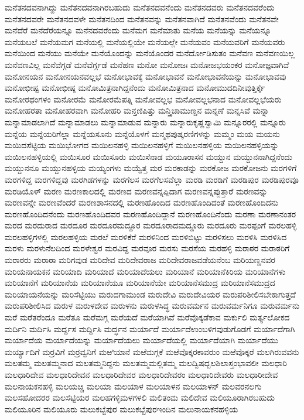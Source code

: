 {ಮನೆತನದವನಾಗಿದ್ದು
ಮನೆತನದವನಾಗಿರಬಹುದು
ಮನೆತನದವನೆಂದು
ಮನೆತನದವರು
ಮನೆತನದವರೆಂದು
ಮನೆತನದವರೇ
ಮನೆತನದವಳೇ
ಮನೆತನದಿಂದ
ಮನೆತನವನ್ನು
ಮನೆತನವಾಗಿದೆ
ಮನೆತನವೆಂದು
ಮನೆತನವೇ
ಮನೆದೆರೆ
ಮನೆದೆರೆಯನ್ನೂ
ಮನೆನದವರೆಂದು
ಮನೆಮಗ
ಮನೆಮಾತು
ಮನೆಯ
ಮನೆಯನ್ನು
ಮನೆಯನ್ನೂ
ಮನೆಯಬಲೆ
ಮನೆಯಮಗ
ಮನೆಯಲ್ಲಿ
ಮನೆಯಲ್ಲಿಯೇ
ಮನೆಯಲ್ಲೇ
ಮನೆಯವಂ
ಮನೆಯವರಿಗೆ
ಮನೆಯವರು
ಮನೆಯಿಂದ
ಮನೆಯು
ಮನೆಯೇ
ಮನೆಯೊಂದನ್ನು
ಮನೆಯೊಂದರ
ಮನೆರ್ದೋಡಿಸುತಂ
ಮನೆವಣ
ಮನೆವಣಯಿಲ್ಲ
ಮನೆವಣವಿಲ್ಲ
ಮನೆವೆಗ್ಗಡೆ
ಮನೆವೆರ್ಗ್ಗಡೆ
ಮನೆಹಣ
ಮನೋ
ಮನೋಜಃ
ಮನೋಜಭಯಂಕರ
ಮನೋಜ್ಞವಾಗಿವೆ
ಮನೋನಯನ
ಮನೋನಯನವಲ್ಲಭೆ
ಮನೋಭಾವಕ್ಕೆ
ಮನೋಭಾವನೆ
ಮನೋಭಾವನೆಯನ್ನು
ಮನೋಭಾವವು
ಮನೋಭೀಷ್ಟ
ಮನೋಭೀಷ್ಠ
ಮನೋಮಿತ್ರನಾಗಿದ್ದನೆಂದು
ಮನೋಮಿತ್ರನಾದ
ಮನೋಮುದದಿನೀವುತ್ತಿರ್ಕ್ಕೆ
ಮನೋರಥಂಗಳಂ
ಮನೋರಮೆ
ಮನೋರಮೆಪತ್ನಿ
ಮನೋವಲ್ಲಭ
ಮನೋವಲ್ಲಭನಾದ
ಮನೋವಲ್ಲಭೆಯರು
ಮನೋಹರತಾ
ಮನೋಹರವಾಗಿ
ಮನೋಹರಿ
ಮನ್ತಣಿಪಿತ್ತು
ಮನ್ತ್ರಿಚಾಮುಣ್ಡನ
ಮನ್ನಣೆ
ಮನ್ನಸಿವೆ
ಮನ್ನಾ
ಮನ್ನಾಮಾಡಲಾಗಿದೆ
ಮನ್ನಾಮಾಡಲು
ಮನ್ನಾಮಾಡುವ
ಮನ್ನಾರು
ಮನ್ನಾರುಕೃಷ್ಣಸ್ವಾಮಿ
ಮನ್ನೂರರಲ್ಲಿ
ಮನ್ನೂರು
ಮನ್ನೆಯ
ಮನ್ನೆಯರಿಗೆಲ್ಲಾ
ಮನ್ನೆಯಸೂನು
ಮನ್ನೆಯೊಳಗೆ
ಮನ್ಮಥಪುಷ್ಕರಣಿಗಳನ್ನು
ಮಮ್ಮಂ
ಮಯ
ಮಯನು
ಮಯಿದಸೆಟ್ಟಿಯ
ಮಯಿಭೋಗದ
ಮಯಿಲನಹಳ್ಳಿ
ಮಯಿಲನಹಳ್ಳಿಗೆ
ಮಯಿಲನಹಳ್ಳಿಯ
ಮಯಿಲನಹಳ್ಳಿಯನ್ನು
ಮಯಿಲನಹಳ್ಳಿಯಲ್ಲಿ
ಮಯಿಸೂರ
ಮಯಿಸೂರು
ಮಯಿಸೆನಾಡ
ಮಯೂರಾಸನ
ಮಯ್ದುನ
ಮಯ್ದುನನಾಗಿದ್ದನೆಂದು
ಮಯ್ದುನನೂ
ಮಯ್ದುನಹಳ್ಳಿಯ
ಮಯ್ಯಂಗಳು
ಮಯ್ವೆತ್ತ
ಮರ
ಮರಕಾಡನ್ನು
ಮರಕೋಜ
ಮರಕೋಜನು
ಮರಗಳಿಗೆ
ಮರಗಳಿದ್ದ
ಮರಗಳಿದ್ದವು
ಮರಗಿಡಗಳನ್ನು
ಮರಗೆಲಸ
ಮರಗೆಲಸವೆಲ್ಲಾ
ಮರಡಿ
ಮರಡಿಗೆ
ಮರಡಿಪುರ
ಮರಡಿಪುರವೂ
ಮರಡಿಯೊಳ್
ಮರಣ
ಮರಣಕಾಲದಲ್ಲಿ
ಮರಣದ
ಮರಣವನ್ನಪ್ಪಿದಾಗ
ಮರಣವನ್ನಪ್ಪುತ್ತಾರೆ
ಮರಣವನ್ನು
ಮರಣವನ್ನೇ
ಮರಣವೆಂದರೆ
ಮರಣಶಾಸನದಲ್ಲಿ
ಮರಣಹೊಂದಿದ
ಮರಣಹೊಂದಿದಂತೆ
ಮರಣಹೊಂದಿದನು
ಮರಣಹೊಂದಿದನೆಂದು
ಮರಣಹೊಂದಿದವರ
ಮರಣಹೊಂದಿದ್ದಾನೆ
ಮರಣಹೊಂದಿನೆಂದು
ಮರಣಾ
ಮರಣಾನಂತರ
ಮರದ
ಮರದುರಾದ
ಮರದೂರ
ಮರದೂರಮದ್ದೂರ
ಮರದೂರಾದಮದ್ದೂರು
ಮರದೂರು
ಮರಪ್ಪಂಗೆ
ಮರಲಹಳ್ಳಿ
ಮರಲಹಳ್ಳಿಗಳಲ್ಲಿ
ಮರಲಹಳ್ಳಿಯ
ಮರಲೆ
ಮರಳಿಕೆರೆ
ಮರಳಿನಿಂದ
ಮರಳಿಬಿಟ್ಟು
ಮರಳಿಸಲು
ಮರಳಿಸಿ
ಮರಳಿಸಿದ
ಮರಳು
ಮರಳುನೆಲದಿಂದ
ಮರಳೇಶ್ವರ
ಮರವಿದ್ದ
ಮರವೂರ
ಮರಸು
ಮರಸೆಯ
ಮರಹಳ್ಳಿ
ಮರಾಠರ
ಮರಾಠರಿಗೆ
ಮರಾಠರು
ಮರಾಠಾ
ಮರಿಗವುಡ
ಮರಿದೇವ
ಮರಿದೇವರಾಜ
ಮರಿದೇವರಾಜವಡೆಯನೆಂಬ
ಮರಿಯಣ್ಣನವರ
ಮರಿಯನಾಯಕನ
ಮರಿಯಾದಿ
ಮರಿಯಾದೆ
ಮರಿಯಾದೆಯಲು
ಮರಿಯಾನೆ
ಮರಿಯಾನೆಕಿರಿಯ
ಮರಿಯಾನೆಗಳು
ಮರಿಯಾನೆಗೆ
ಮರಿಯಾನೆಯ
ಮರಿಯಾನೆಯೂ
ಮರಿಯಾನೆಯೇ
ಮರಿಯಾನೆಸಮುದ್ರ
ಮರಿಯಾನೆಸಮುದ್ರದ
ಮರಿಯಾಯನೆಯನ್ನು
ಮರಿಸೆಟ್ಟಿಯು
ಮರುದಗಾಮುಂಡ
ಮರುದೇವಿ
ಮರುದೇವಿಯರ
ಮರುಪರಿಶೀಲಿಸಬೇಕಾಗುತ್ತದೆ
ಮರುಪರಿಶೀಲಿಸಿದ
ಮರುಳ
ಮರುಳದೇವ
ಮರುಳನು
ಮರುಳಸಿದ್ಧ
ಮರುವರ್ಮನ
ಮರುವರ್ಮನಿಗೂ
ಮರುವರ್ಮನು
ಮರೆ
ಮರೆತರೆಂದೂ
ಮರೆತೂ
ಮರೆಮಗ್ಗ
ಮರೆಯದೆ
ಮರೆಯಾಗಿವೆ
ಮರೆವೊಕ್ಕಡೆಕಾವ
ಮರ್ಕುಲಿ
ಮರ್ತ್ಯಲೋಕದ
ಮರ್ದಿನಿ
ಮರ್ದಿಸಿ
ಮರ್ದ್ದಸ
ಮರ್ದ್ದಿಸಿ
ಮರ್ದ್ಧನ
ಮರ್ಯಾದೆ
ಮರ್ಯಾದೆಉಂಬಳಿಗವುಡುಗೊಡಗೆ
ಮರ್ಯಾದೆಗಾಗಿ
ಮರ್ಯಾದೆಯ
ಮರ್ಯಾದೆಯನ್ನು
ಮರ್ಯಾದೆಯಲು
ಮರ್ಯಾದೆಯಲ್ಲಿ
ಮರ್ಯಾದೆಯಾಗಿ
ಮರ್ಯಾದೆಯು
ಮರ್ಯ್ಯಾದಿಗೆ
ಮರ್ರವಿಗೆ
ಮರ್ರವ್ವನಿಗೆ
ಮಱಿಯಾನೆ
ಮಱೆಮಗ್ಗಕೆ
ಮಱೆವೊಕ್ಕರಕಾವರುಂ
ಮಱೆವೊಕ್ಕರೆ
ಮಲಗಿರುವವನು
ಮಲತಮ್ಮ
ಮಲತಮ್ಮನಾದ
ಮಲತಮ್ಮನಿದ್ದನು
ಮಲತಮ್ಮಮಲ್ಲಿತಮ್ಮ
ಮಲದ್ವಿಷದ್ಬಲಶಿಲಾಸ್ತಂಭಾವಲೀ
ಮಲಧಾರಿ
ಮಲಧಾರಿದೇವ
ಮಲಧಾರಿದೇವನ
ಮಲಧಾರಿದೇವರ
ಮಲಧಾರಿದೇವರಂ
ಮಲಧಾರಿದೇವರು
ಮಲಧಾರೀದೇವ
ಮಲನಾಯಕನಹಳ್ಳಿ
ಮಲಯಚ್ಚಿ
ಮಲಯಾ
ಮಲಯಾಳ
ಮಲಯಾಳನ
ಮಲಯಾಳನ್
ಮಲವರನಲಗು
ಮಲಸಹೋದರರ
ಮಲಸೆಟ್ಟಿಯರ
ಮಲಹಗಳ್ಳಿಮಳಗಳಲಿ
ಮಲಿತಂಮ
ಮಲಿದೇವ
ಮಲಿಯೂರಾಗಿರಬಹುದು
ಮಲಿಯೂರಿನ
ಮಲಿಯೂರು
ಮಲುಕಬ್ಬೆಪುರ
ಮಲುಕಬ್ಬೆಪುರಇಂದಿನ
ಮಲುನಾಯಕನಹಳ್ಳಿಯ
}
